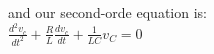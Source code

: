 \documentclass[preview]{standalone}
\begin{document}
\begin{center}
\raggedright
                and our second-orde equation is: \\ 
                $\frac{d^2v_c}{dt^2} + \frac{R}{L} \frac{dv_c}{dt} + \frac{1}{LC}v_C = 0$
\end{center}
\end{document}

